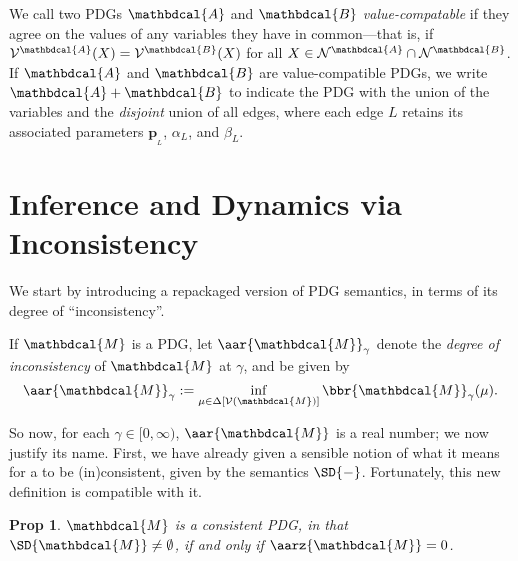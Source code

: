 \documentclass{article}
\theoremstyle{plain}
\newtheorem{prop}[theorem]{Prop}
\theoremstyle{definition}
\theoremstyle{remark}
\let\H\relax
\DeclareMathOperator{\H}{\mathrm{H}} %
\newcommand\mat[1]{\mathbf{#1}}
\newcommand{\thickD}{I\mkern-8muD}
\newcommand{\kldiv}{\thickD\infdivx}
\newcommand{\bp}[1][L]{\mat{p}_{\!_{#1}\!}}
\newcommand{\V}{\mathcal V}
\newcommand{\N}{\mathcal N}
\newcommand{\dg}[1]{\mathbdcal{#1}}
\newcommand{\bundle}{\mathbin{+}}
\newcommand{\ed}[3]{%
		\mathchoice%
		{#2\overset{\smash{\mskip-5mu\raisebox{-3pt}{${#1}$}}}{\xrightarrow{\hphantom{\scriptstyle {#1}}}} #3} %
		{#2\overset{\smash{\mskip-5mu\raisebox{-3pt}{$\scriptstyle {#1}$}}}{\xrightarrow{\hphantom{\scriptstyle {#1}}}} #3}%
		{#2\overset{\smash{\mskip-5mu\raisebox{-3pt}{$\scriptscriptstyle {#1}$}}}{\xrightarrow{\hphantom{\scriptscriptstyle {#1}}}} #3} %
		{#2\overset{\smash{\mskip-5mu\raisebox{-3pt}{$\scriptscriptstyle {#1}$}}}{\xrightarrow{\hphantom{\scriptscriptstyle {#1}}}} #3}} %
\newcommand{\alle}[1][L]{_{\ed {#1}XY}}
\begin{document}
We call two PDGs $\dg A$ and $\dg B$ \emph{value-compatable} if they agree
on the values of any variables they have in common---that is, if
$\V^{\dg A}(X) = \V^{\dg B}(X)$ for all $X \in \N^{\dg A} \cap \N^{\dg B}$.
%
If $\dg A$ and $\dg B$ are value-compatible PDGs, we write $\dg A \bundle \dg B$ to indicate the PDG with the union of the variables and the \emph{disjoint} union of all edges, where each edge $L$ retains its associated parameters $\bp$, $\alpha_L$, and $\beta_L$.

\section{Inference and Dynamics via Inconsistency}
We start by introducing a repackaged version of PDG semantics,
in terms of its degree of ``inconsistency''.

\begin{defn}
	If $\dg M$ is a PDG, let $\aar{\dg M}_\gamma$ denote the \emph{degree of
	inconsistency} of $\dg M$ at $\gamma$, and be given by
	$$ \aar{\dg M}_\gamma := \inf_{\mu \in \Delta[\V(\dg M)]}
		\bbr{\dg M}_\gamma(\mu)
		.
	$$
\end{defn}

So now, for each $\gamma \in [0, \infty)$, $\aar{\dg M}$ is a real number;
we now justify its name.
First, we have already given a sensible notion of what it means
for a to be (in)consistent, given by the semantics $\SD{-}$. Fortunately,
this new definition is compatible with it.

\begin{prop}
	$\dg M$ is a \emph{consistent} PDG, in that $\SD{\dg M} \ne \emptyset$,
	if and only if $\aarz{\dg M} = 0$.
\end{prop}

\end{document}
